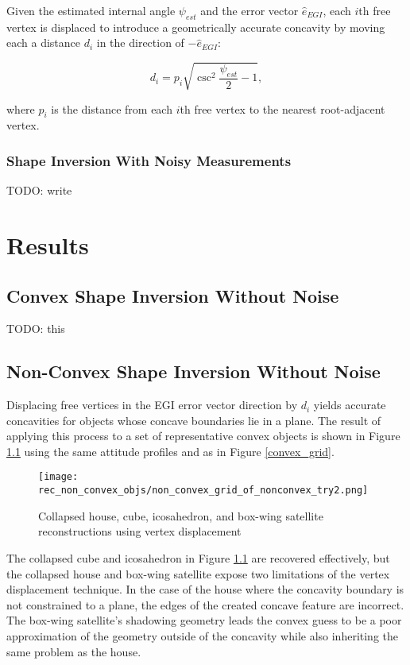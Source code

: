 Given the estimated internal angle $\psi_{est}$ and the error vector $\hat{e}_{EGI}$, each $i$th free vertex is displaced to introduce a geometrically accurate concavity by moving each a distance $d_i$ in the direction of $-\hat{e}_{EGI}$:

\begin{equation} \label{eq:flip_depth}
  d_i = p_i \sqrt{\csc^2 \frac{\psi_{est}}{2} - 1},
\end{equation}

where $p_i$ is the distance from each $i$th free vertex to the nearest root-adjacent vertex.

\subsection{Shape Inversion With Noisy Measurements}

TODO: write

\chapter{Results}

\section{Convex Shape Inversion Without Noise}

TODO: this

\section{Non-Convex Shape Inversion Without Noise}

Displacing free vertices in the EGI error vector direction by $d_i$ yields accurate concavities for objects whose concave boundaries lie in a plane. The result of applying this process to a set of representative convex objects is shown in Figure \ref{fig:non_convex_recon_of_non_convex} using the same attitude profiles and as in Figure \ref{convex_grid}. 

\begin{figure}[!htb]
  \centering
  \texttt{[image: rec\_non\_convex\_objs/non\_convex\_grid\_of\_nonconvex\_try2.png]}
  \caption{Collapsed house, cube, icosahedron, and box-wing satellite reconstructions using vertex displacement}
  \label{fig:non_convex_recon_of_non_convex}
\end{figure}

The collapsed cube and icosahedron in Figure \ref{fig:non_convex_recon_of_non_convex} are recovered effectively, but the collapsed house and box-wing satellite expose two limitations of the vertex displacement technique. In the case of the house where the concavity boundary is not constrained to a plane, the edges of the created concave feature are incorrect. The box-wing satellite's shadowing geometry leads the convex guess to be a poor approximation of the geometry outside of the concavity while also inheriting the same problem as the house.

